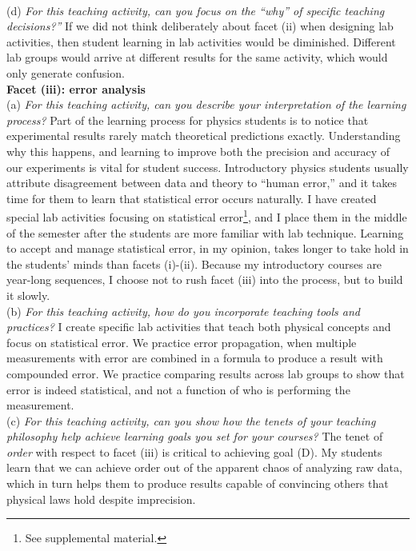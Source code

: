 \documentclass[../../../main.tex]{subfiles}
\begin{document}
\\
\vspace{0.25cm}
(d) \textit{For this teaching activity, can you focus on the ``why'' of specific teaching decisions?''}  If we did not think deliberately about facet (ii) when designing lab activities, then student learning in lab activities would be diminished.  Different lab groups would arrive at different results for the same activity, which would only generate confusion.
\\
\vspace{0.25cm}
\textbf{Facet (iii): error analysis}
\\
\vspace{0.25cm}
(a) \textit{For this teaching activity, can you describe your interpretation of the learning process?}  Part of the learning process for physics students is to notice that experimental results rarely match theoretical predictions exactly.  Understanding why this happens, and learning to improve both the precision and accuracy of our experiments is vital for student success.  Introductory physics students usually attribute disagreement between data and theory to ``human error,'' and it takes time for them to learn that statistical error occurs naturally.  I have created special lab activities focusing on statistical error\footnote{See supplemental material.}, and I place them in the middle of the semester after the students are more familiar with lab technique.  Learning to accept and manage statistical error, in my opinion, takes longer to take hold in the students' minds than facets (i)-(ii).  Because my introductory courses are year-long sequences, I choose not to rush facet (iii) into the process, but to build it slowly.
\\
\vspace{0.25cm}
(b) \textit{For this teaching activity, how do you incorporate teaching tools and practices?}  I create specific lab activities that teach both physical concepts and focus on statistical error.  We practice error propagation, when multiple measurements with error are combined in a formula to produce a result with compounded error.  We practice comparing results across lab groups to show that error is indeed statistical, and not a function of who is performing the measurement.
\\
\vspace{0.25cm}
(c) \textit{For this teaching activity, can you show how the tenets of your teaching philosophy help achieve learning goals you
set for your courses?}  The tenet of \textit{order} with respect to facet (iii) is critical to achieving goal (D).  My students learn that we can achieve order out of the apparent chaos of analyzing raw data, which in turn helps them to produce results capable of convincing others that physical laws hold despite imprecision.
\end{document}
